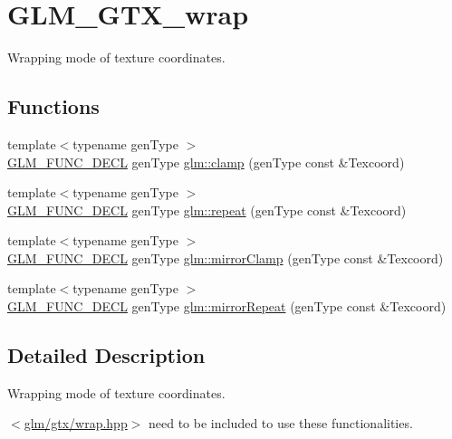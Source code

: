 \hypertarget{group__gtx__wrap}{}\section{G\+L\+M\+\_\+\+G\+T\+X\+\_\+wrap}
\label{group__gtx__wrap}


Wrapping mode of texture coordinates.  


\subsection*{Functions}
\begin{DoxyCompactItemize}
\item 
{\footnotesize template$<$typename gen\+Type $>$ }\\\mbox{\hyperlink{setup_8hpp_ab2d052de21a70539923e9bcbf6e83a51}{G\+L\+M\+\_\+\+F\+U\+N\+C\+\_\+\+D\+E\+CL}} gen\+Type \mbox{\hyperlink{group__gtx__wrap_ga6c0cc6bd1d67ea1008d2592e998bad33}{glm\+::clamp}} (gen\+Type const \&Texcoord)
\item 
{\footnotesize template$<$typename gen\+Type $>$ }\\\mbox{\hyperlink{setup_8hpp_ab2d052de21a70539923e9bcbf6e83a51}{G\+L\+M\+\_\+\+F\+U\+N\+C\+\_\+\+D\+E\+CL}} gen\+Type \mbox{\hyperlink{group__gtx__wrap_ga809650c6310ea7c42666e918c117fb6f}{glm\+::repeat}} (gen\+Type const \&Texcoord)
\item 
{\footnotesize template$<$typename gen\+Type $>$ }\\\mbox{\hyperlink{setup_8hpp_ab2d052de21a70539923e9bcbf6e83a51}{G\+L\+M\+\_\+\+F\+U\+N\+C\+\_\+\+D\+E\+CL}} gen\+Type \mbox{\hyperlink{group__gtx__wrap_gaa6856a0a048d2749252848da35e10c8b}{glm\+::mirror\+Clamp}} (gen\+Type const \&Texcoord)
\item 
{\footnotesize template$<$typename gen\+Type $>$ }\\\mbox{\hyperlink{setup_8hpp_ab2d052de21a70539923e9bcbf6e83a51}{G\+L\+M\+\_\+\+F\+U\+N\+C\+\_\+\+D\+E\+CL}} gen\+Type \mbox{\hyperlink{group__gtx__wrap_ga16a89b0661b60d5bea85137bbae74d73}{glm\+::mirror\+Repeat}} (gen\+Type const \&Texcoord)
\end{DoxyCompactItemize}


\subsection{Detailed Description}
Wrapping mode of texture coordinates. 

$<$\mbox{\hyperlink{wrap_8hpp}{glm/gtx/wrap.\+hpp}}$>$ need to be included to use these functionalities. 

